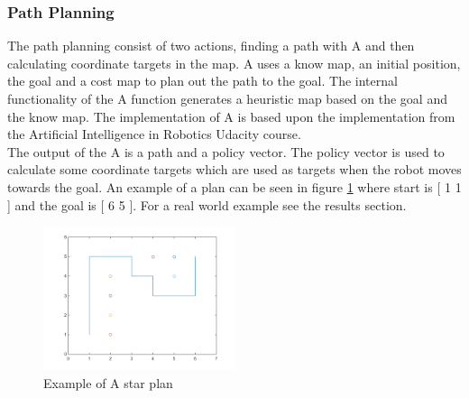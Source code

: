 \subsubsection{Path Planning}
The path planning consist of two actions, finding a path with A\text{*} and then calculating coordinate targets in the map. 
A\text{*} uses a know map, an initial position, the goal and a cost map to plan out the path to the goal. 
The internal functionality of the A\text{*} function generates a heuristic map based on the goal and the know map. The implementation of A\text{*} is based upon the implementation from the Artificial Intelligence in Robotics Udacity course\citep{AIROK}.\\
The output of the A\text{*} is a path and a policy vector. The policy vector is used to calculate some coordinate targets which are used as targets when the robot moves towards the goal. An example of a plan can be seen in figure \ref{fig:exastar} where start is [ 1 1 ] and the goal is [ 6 5 ]. For a real world example see the results section.
\begin{figure}[H]
\centering
\includegraphics[width=0.5\textwidth]{billeder/exampleastar}
\caption{Example of A star plan}
\label{fig:exastar}
\end{figure}
